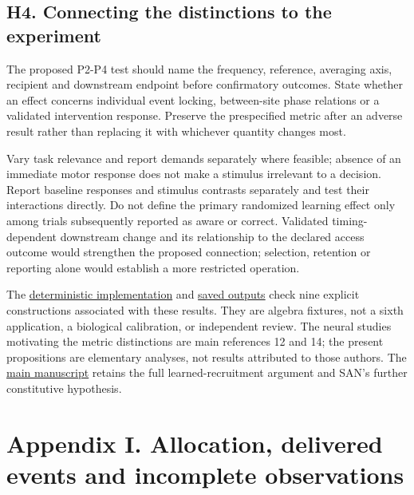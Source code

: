 \documentclass[
  american,
  11pt,
  letterpaper,
]{article}
\begin{document}
\subsection{H4. Connecting the distinctions to the experiment}\label{h4.-connecting-the-distinctions-to-the-experiment}

The proposed P2-P4 test should name the frequency, reference, averaging axis, recipient and downstream endpoint before confirmatory outcomes. State whether an effect concerns individual event locking, between-site phase relations or a validated intervention response. Preserve the prespecified metric after an adverse result rather than replacing it with whichever quantity changes most.

Vary task relevance and report demands separately where feasible; absence of an immediate motor response does not make a stimulus irrelevant to a decision. Report baseline responses and stimulus contrasts separately and test their interactions directly. Do not define the primary randomized learning effect only among trials subsequently reported as aware or correct. Validated timing-dependent downstream change and its relationship to the declared access outcome would strengthen the proposed connection; selection, retention or reporting alone would establish a more restricted operation.

The \href{https://github.com/v5ma/v5ma.github.io/blob/master/papers/companions/learning-to-feel-v1.0/analysis/access-metric-check.mjs}{deterministic implementation} and \href{https://github.com/v5ma/v5ma.github.io/blob/master/papers/companions/learning-to-feel-v1.0/analysis/access-metric-results.json}{saved outputs} check nine explicit constructions associated with these results. They are algebra fixtures, not a sixth application, a biological calibration, or independent review. The neural studies motivating the metric distinctions are main references 12 and 14; the present propositions are elementary analyses, not results attributed to those authors. The \href{https://zenodo.org/records/23455801/files/Learning-to-Feel-v1.1.pdf}{main manuscript} retains the full learned-recruitment argument and SAN's further constitutive hypothesis.

\clearpage
\hypertarget{appendix-i}{}

\section{Appendix I. Allocation, delivered events and incomplete observations}\label{appendix-i.-allocation-delivered-events-and-incomplete-observations}
\end{document}

